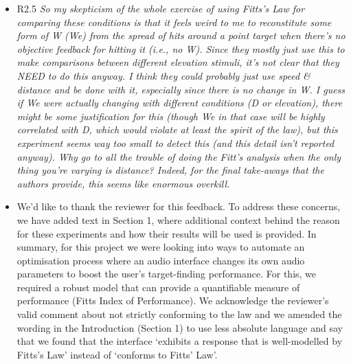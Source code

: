 \documentclass{scrartcl}
\begin{document}
\begin{itemize}
  \item R2.5 \textit{So my skepticism of the whole exercise of using Fitts’s Law for comparing these conditions is that it feels weird to me to reconstitute some form of W (We) from the spread of hits around a point target when there’s no objective feedback for hitting it (i.e., no W). Since they mostly just use this to make comparisons between different elevation stimuli, it’s not clear that they NEED to do this anyway. I think they could probably just use speed \& distance and be done with it, especially since there is no change in W. I guess if We were actually changing with different conditions (D or elevation), there might be some justification for this (though We in that case will be highly correlated with D, which would violate at least the spirit of the law), but this experiment seems way too small to detect this (and this detail isn’t reported anyway). Why go to all the trouble of doing the Fitt’s analysis when the only thing you’re varying is distance? Indeed, for the final take-aways that the authors provide, this seems like enormous overkill.}
  \item[] We'd like to thank the reviewer for this feedback.
    To address these concerns, we have added text in Section 1, where additional context behind the reason for these experiments and how their results will be used is provided. 
    In summary, for this project we were looking into ways to automate an optimisation process where an audio interface changes its own audio parameters to boost the user's target-finding performance.
    For this, we required a robust model that can provide a quantifiable measure of performance (Fitts Index of Performance).
    We acknowledge the reviewer's valid comment about not strictly conforming to the law and we amended the wording in the Introduction (Section 1) to use less absolute language and say that we found that the interface `exhibits a response that is well-modelled by Fitts’s Law'  instead of `conforms to Fitts' Law'.


\end{itemize}
\end{document}
